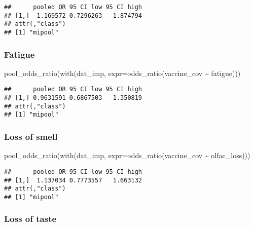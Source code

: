 \documentclass[
]{article}
\newenvironment{Shaded}{\begin{snugshade}}{\end{snugshade}}
\newcommand{\AttributeTok}[1]{\textcolor[rgb]{0.77,0.63,0.00}{#1}}
\newcommand{\FunctionTok}[1]{\textcolor[rgb]{0.00,0.00,0.00}{#1}}
\newcommand{\NormalTok}[1]{#1}
\newcommand{\SpecialCharTok}[1]{\textcolor[rgb]{0.00,0.00,0.00}{#1}}
\begin{document}
\begin{verbatim}
##      pooled OR 95 CI low 95 CI high
## [1,]  1.169572 0.7296263   1.874794
## attr(,"class")
## [1] "mipool"
\end{verbatim}

\hypertarget{fatigue-1}{%
\subsubsection{Fatigue}\label{fatigue-1}}

\begin{Shaded}
\begin{Highlighting}[]
\FunctionTok{pool\_odds\_ratio}\NormalTok{(}\FunctionTok{with}\NormalTok{(dat\_imp, }\AttributeTok{expr=}\FunctionTok{odds\_ratio}\NormalTok{(vaccine\_cov }\SpecialCharTok{\textasciitilde{}}\NormalTok{ fatigue))) }
\end{Highlighting}
\end{Shaded}

\begin{verbatim}
##      pooled OR 95 CI low 95 CI high
## [1,] 0.9631591 0.6867503   1.350819
## attr(,"class")
## [1] "mipool"
\end{verbatim}

\hypertarget{loss-of-smell}{%
\subsubsection{Loss of smell}\label{loss-of-smell}}

\begin{Shaded}
\begin{Highlighting}[]
\FunctionTok{pool\_odds\_ratio}\NormalTok{(}\FunctionTok{with}\NormalTok{(dat\_imp, }\AttributeTok{expr=}\FunctionTok{odds\_ratio}\NormalTok{(vaccine\_cov }\SpecialCharTok{\textasciitilde{}}\NormalTok{ olfac\_loss))) }
\end{Highlighting}
\end{Shaded}

\begin{verbatim}
##      pooled OR 95 CI low 95 CI high
## [1,]  1.137034 0.7773557   1.663132
## attr(,"class")
## [1] "mipool"
\end{verbatim}

\hypertarget{loss-of-taste-1}{%
\subsubsection{Loss of taste}\label{loss-of-taste-1}}
\end{document}
